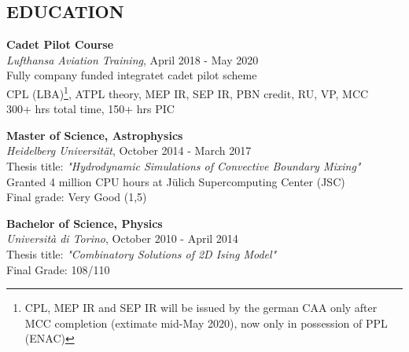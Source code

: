 \documentclass[margin]{res}
\begin{document}
\begin{resume}


\section{EDUCATION}

\textbf{Cadet Pilot Course}\\
{\sl Lufthansa Aviation Training}, April 2018 - May 2020\\
Fully company funded integratet cadet pilot scheme\\
CPL (LBA)\footnote{CPL, MEP IR and SEP IR will be issued by the german CAA only after MCC completion (extimate mid-May 2020), now only in possession of PPL (ENAC)}, ATPL theory, MEP IR, SEP IR, PBN credit, RU, VP, MCC\\
300+ hrs total time, 150+ hrs PIC

\textbf{Master of Science, Astrophysics}\\
{\sl Heidelberg Universität}, October 2014 - March 2017\\
Thesis title: \textit{"Hydrodynamic Simulations of Convective Boundary Mixing"}\\
Granted 4 million CPU hours at Jülich Supercomputing Center (JSC)\\
\hfill Final grade: Very Good (1,5)

\textbf{Bachelor of Science, Physics} \\
{\sl Università di Torino}, October 2010 - April 2014\\
Thesis title: \textit{"Combinatory Solutions of 2D Ising Model"}\\
\hfill Final Grade: 108/110


\end{resume}
\end{document}
